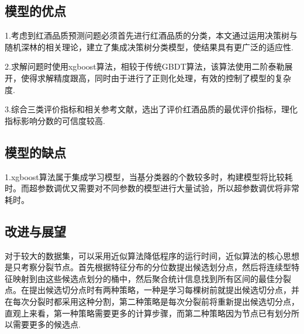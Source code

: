 \documentclass{whutmod}
\begin{document}
\subsection{模型的优点}
1.考虑到红酒品质预测问题必须首先进行红酒品质的分类，本文通过运用决策树与随机深林的相关理论，建立了集成决策树分类模型，使结果具有更广泛的适应性.

2.求解问题时使用xgboost算法，相较于传统GBDT算法，该算法使用二阶泰勒展开，使得求解精度跟高，同时由于进行了正则化处理，有效的控制了模型的复杂度.

3.综合三类评价指标和相关参考文献，选出了评价红酒品质的最优评价指标，理化指标影响分数的可信度较高.

\subsection{模型的缺点}
1.xgboost算法属于集成学习模型，当基分类器的个数较多时，构建模型将比较耗时。而超参数调优又需要对不同参数的模型进行大量试验，所以超参数调优将非常耗时。


\subsection{改进与展望}
对于较大的数据集，可以采用近似算法降低程序的运行时间，近似算法的核心思想是只考察分裂节点。首先根据特征分布的分位数提出候选划分点，然后将连续型特征映射到由这些候选点划分的桶中，然后聚合统计信息找到所有区间的最佳分裂点。在提出候选切分点时有两种策略，一种是学习每棵树前就提出候选切分点，并在每次分裂时都采用这种分割，第二种策略是每次分裂前将重新提出候选切分点，直观上来看，第一种策略需要更多的计算步骤，而第二种策略因为节点已有划分所以需要更多的候选点.
\end{document}
